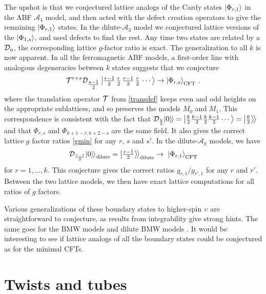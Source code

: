 The upshot is that we conjectured lattice analogs of the Cardy states $\Ket{\Phi_{r,1}}$ in the ABF $\mathcal{A}_4$ model, and then acted with the defect creation operators to give the remaining  $\Ket{\Phi_{r,1}}$ states.
In the dilute-$\mathcal{A}_3$ model we conjectured lattice versions of the $\Ket{\Phi_{1,s}}$, and used defects to find the rest.
Any time two states are related by a $\mathcal{D}_a$, the corresponding lattice $g$-factor ratio is exact. The generalization to all $k$ is now apparent. In all the ferromagnetic ABF models, a first-order line with analogous degeneracies between $k$ states \cite{Andrews1984,Huse1984} suggests that we conjecture 
\begin{align}
	\mathcal{T}^{r+s}\mathcal{D}_{\tfrac{s-1}{2}} \Ket{\tfrac{r-1}{2}\,\tfrac{r}{2}\,\tfrac{r-1}{2}\,\tfrac{r}{2}\,\cdots} \to \Ket{\Phi_{r,s}}_{\rm CFT}^{} \,.
\label{ABFconj3}
\end{align}
where the translation operator $\mathcal{T}$ from \eqref{transdef} keeps even and odd heights on the appropriate sublattices, and so preserves the models $M_0$ and ${M}_1$.
This correspondence is consistent with the fact that $\mathcal{D}_{\frac{k}2}{|{0}\rangle\mkern-2mu\rangle} = \Ket{\frac{k}{2}\frac{k-1}{2}\frac{k}{2}\frac{k-1}{2}\cdots} = {\big|{\frac{k}{2}}\big\rangle\!\big\rangle}$ and that $\Phi_{r,s}$ and $\Phi_{k+1-r,k+2-s}$ are the same field.
It also gives the correct lattice $g$ factor ratios \eqref{gmin} for any $r$, $s$ and $s'$. In the dilute-$\mathcal{A}_k$ models, we have 
\begin{align}
	\mathcal{D}_{\frac{r-1}2}{|{0}\rangle\mkern-2mu\rangle}_{\rm dilute}=
	{\big|{\tfrac{r-1}{2}}\big\rangle\!\big\rangle}_{\rm dilute} \to\ \Ket{\Phi_{r,1}}_{\rm CFT}^{}
\label{diluteconj1}
\end{align}
for $r=1,\dots,k$.
This conjecture gives the correct ratios $g_{r,1}/g_{r',1}$ for any $r$ and $r'$.
Between the two lattice models, we then have exact lattice computations for all ratios of $g$ factors.


Various generalizations of these boundary states to higher-spin $\upsilon$ are straightforward to conjecture, as results from integrability \cite{Date:1987} give strong hints.  The same goes for the BMW models \cite{Jimbo:1987} and dilute BMW models \cite{Grimm1994}. It would be interesting to see if lattice analogs of all the boundary states could be conjectured as for the minimal CFTs. 






\section{Twists and tubes}
\label{sec:twists}


